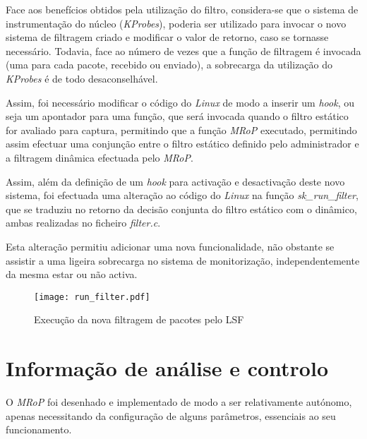 Face aos benefícios obtidos pela utilização do filtro, considera-se que o sistema de instrumentação do núcleo (\textit{KProbes}), poderia ser utilizado para invocar o novo sistema de filtragem criado e modificar o valor de retorno, caso se tornasse necessário.
Todavia, face ao número de vezes que a função de filtragem é invocada (uma para cada pacote, recebido ou enviado), a sobrecarga da utilização do \textit{KProbes} é de todo desaconselhável.

Assim, foi necessário modificar o código do \textit{Linux} de modo a inserir um \textit{hook}, ou seja um apontador para uma função, que será invocada quando o filtro estático for avaliado para captura, permitindo que a função \textit{MRoP} executado, permitindo assim efectuar uma conjunção entre o filtro estático definido pelo administrador e a filtragem dinâmica efectuada pelo \textit{MRoP}.

Assim, além da definição de um \textit{hook} para activação e desactivação deste novo sistema, foi efectuada uma alteração ao código do \textit{Linux} na função \textit{sk\_run\_filter}, que se traduziu no retorno da decisão conjunta do filtro estático com o dinâmico, ambas realizadas no ficheiro \textit{filter.c}.

Esta alteração permitiu adicionar uma nova funcionalidade, não obstante se assistir a uma ligeira sobrecarga no sistema de monitorização, independentemente da mesma estar ou não activa.

\begin{figure}[!ht]
\centering
\texttt{[image: run\_filter.pdf]}
\caption{Execução da nova filtragem de pacotes pelo LSF}
\label{fig:run_filter}
\end{figure}





\section{Informação de análise e controlo}

O \textit{MRoP} foi desenhado e implementado de modo a ser relativamente autónomo, apenas necessitando da configuração de alguns parâmetros, essenciais ao seu funcionamento.

